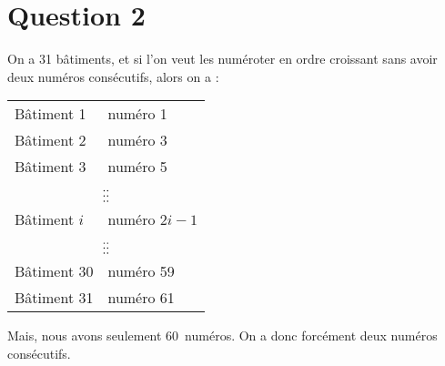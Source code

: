 \newpage
\section*{Question 2}
On a 31 bâtiments, et si l’on veut les numéroter en ordre croissant sans avoir deux numéros consécutifs, alors on a :

\begin{center}
	\begin{tabular}{l@{ $\rightarrow$ }l}
		 Bâtiment 1  & numéro 1                                          \\
		 Bâtiment 2  & numéro 3                                          \\
		 Bâtiment 3  & numéro 5                                          \\
		\multicolumn{2}{c}{$\hfill\vdots\hfill\hfill\hfill\vdots\hfill\hfill$} \\
		Bâtiment $i$ & numéro $2 i - 1$                                  \\
		\multicolumn{2}{c}{$\hfill\vdots\hfill\hfill\hfill\vdots\hfill\hfill$} \\
		Bâtiment 30  & numéro 59                                         \\
		Bâtiment 31  & numéro 61
	\end{tabular}
	\end{center}

Mais, nous avons seulement 60~numéros. On a donc forcément deux numéros consécutifs.